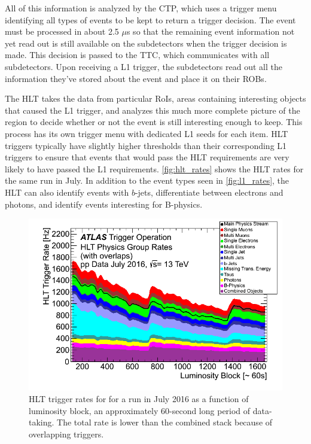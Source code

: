 
All of this information is analyzed by the \ac{CTP}, which uses a trigger menu identifying all types of events to be kept to return a trigger decision. The event must be processed in about 2.5 $\mu$s so that the remaining event information not yet read out is still available on the subdetectors when the trigger decision is made. This decision is passed to the \ac{TTC}, which communicates with all subdetectors. Upon receiving a \ac{L1} trigger, the subdetectors read out all the information they've stored about the event and place it on their \acp{ROB}.

The \ac{HLT} takes the data from particular \acp{RoI}, areas containing interesting objects that caused the \ac{L1} trigger, and analyzes this much more complete picture of the region to decide whether or not the event is still interesting enough to keep. This process has its own trigger menu with dedicated \ac{L1} seeds for each item. \ac{HLT} triggers typically have slightly higher thresholds than their corresponding \ac{L1} triggers to ensure that events that would pass the \ac{HLT} requirements are very likely to have passed the \ac{L1} requirements. \autoref{fig:hlt_rates} shows the \ac{HLT} rates for the same run in July. In addition to the event types seen in \autoref{fig:l1_rates}, the \ac{HLT} can also identify events with $b$-jets, differentiate between electrons and photons, and identify events interesting for B-physics. 

\begin{centering}
\begin{figure}[!hbt]
\myfloatalign
\includegraphics[width=.90\linewidth]{figures/atlas/Time_HLTGroupRate_Stack_2016_07.png}
\caption{\ac{HLT} trigger rates for for a run in July 2016 as a function of luminosity block, an approximately 60-second long period of data-taking. The total rate is lower than the combined stack because of overlapping triggers.}
\label{fig:hlt_rates}
\end{figure}
\end{centering}


